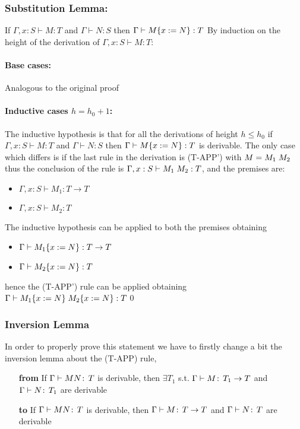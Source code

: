 \subsubsection*{Substitution Lemma:}

If $\Gamma, x: S \vdash M: T$ and $\Gamma \vdash N: S$ then $\Gamma \vdash M\{x:=N\}: T$
By induction on the height of the derivation of $\Gamma, x: S \vdash M: T$:

\paragraph*{Base cases:\\}
Analogous to the original proof

\paragraph*{Inductive cases $h = h_0 + 1$:\\}

The inductive hypothesis is that for all the derivations of height $h \le h_0$ if
$\Gamma, x: S \vdash M: T$ and $\Gamma \vdash N: S$ then $\Gamma \vdash M\{x:=N\}: T$
is derivable.
The only case which differs is if the last rule in the derivation is (T-APP') with
$M = M_1\;M_2$ thus the conclusion of the rule is $\Gamma, x: S \vdash M_1\;M_2: T$,
and the premises are:
\begin{itemize}
	\item $\Gamma, x: S \vdash M_1 : T \to T$
	\item $\Gamma, x: S \vdash M_2: T$
\end{itemize}

The inductive hypothesis can be applied to both the premises obtaining
\begin{itemize}
	\item $\Gamma \vdash M_1\{x:=N\}: T \to T$
	\item $\Gamma \vdash M_2\{x:=N\}: T$
\end{itemize}
hence the (T-APP') rule can be applied obtaining
$\Gamma \vdash M_1\{x:=N\}\;M_2\{x:=N\}: T$\qed

\subsubsection*{Inversion Lemma}

In order to properly prove this statement we have to firstly change a
bit the inversion lemma about the (T-APP) rule,
\begin{itemize}
\item[\textbf{from}] If \(\Gamma \vdash M N \!:\,T\) is derivable,
  then \(\exists T_1\) s.t. \(\Gamma \vdash M \!:\,T_1 \to T\) and
  \(\Gamma \vdash N \!:\,T_1\) are derivable
\item[\textbf{to}] If \(\Gamma \vdash M N \!:\,T\) is derivable,
  then \(\Gamma \vdash M \!:\,T \to T\) and \(\Gamma \vdash N
  \!:\,T\) are derivable
\end{itemize}

